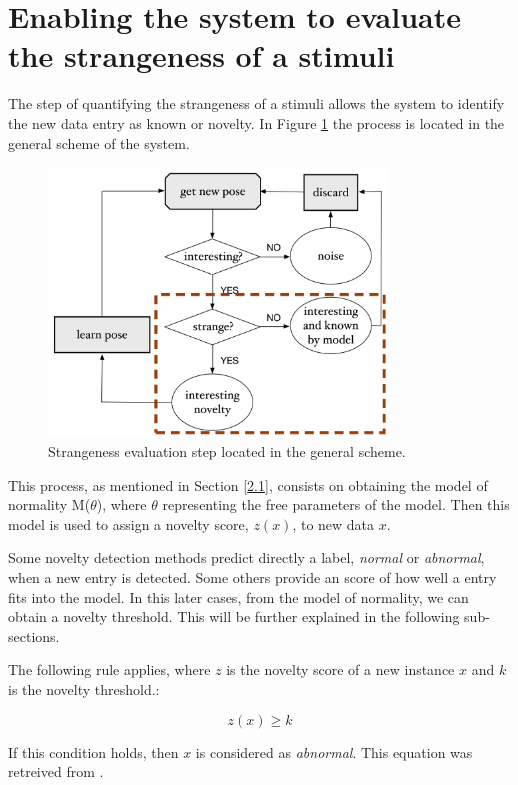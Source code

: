 \section{Enabling the system to evaluate the strangeness of a stimuli} \label{3.1}

The step of quantifying the strangeness of a stimuli allows the system to identify the new data entry as known or novelty. In Figure \ref{fig:sche_strange} the process is located in the general scheme of the system. 

\begin{figure}[h]
\includegraphics[width=9cm]{Figures/Esquema_strange}
\centering
\caption{Strangeness evaluation step located in the general scheme. \label{fig:sche_strange}}
\end{figure}

This process, as mentioned in Section \ref{2.1}, consists on obtaining the model of normality M(\( \theta  \)), where \( \theta  \)
representing the free parameters of the model. Then this model is used to assign a novelty score, $z(x)$, to new data $x$. 

Some novelty detection methods predict directly a label, \emph{normal} or \emph{abnormal}, when a new entry is detected. Some others provide an score of how well a entry fits into the model. In this later cases, from the model of normality, we can obtain a novelty threshold. This will be further explained in the following sub-sections.

The following rule applies, where $z$ is the novelty score of a new instance $x$ and $k$ is the novelty threshold.:
\medskip

\begin{equation}
	z(x) \geq  k 
\end{equation}

If this condition holds, then $x$ is considered as \emph{abnormal}. This equation was retreived from \cite{Pimentel2014}. 

